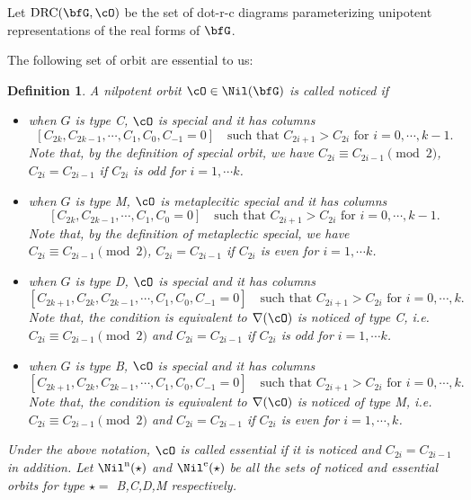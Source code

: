 \documentclass[12pt,a4paper]{amsart}
\def\DD{\nabla}
\numberwithin{equation}{section}
\newtheorem{defn}[thm]{Definition}
\theoremstyle{remark}
\def\nNil{\Nil^{\mathrm n}}
\def\eNil{\Nil^{\mathrm e}}
\def\drc{\mathrm{DRC}}
\newcommand{\noticed}{noticed }
\newcommand{\ess}{essential }
\begin{document}
Let $\drc(\bfG,\cO)$ be the set of dot-r-c diagrams parameterizing unipotent
representations of the real forms of $\bfG$.


The following set of orbit are essential to us:
\begin{defn}
  A nilpotent orbit $\cO\in \Nil(\bfG)$ is called \noticed if
  \begin{itemize}
    \item when $G$ is type C,
          $\cO$ is special and it has columns
          \[
            [C_{2k},C_{2k-1},\cdots, C_{1},C_{0}, C_{-1}=0]
            \quad \text{such that } C_{2i+1}>C_{2i} \text{ for } i=0, \cdots, k-1.
          \]
           Note that, by the
          definition of special orbit,
          we have $C_{2i}\equiv C_{2i-1} \pmod{2}$, $C_{2i} = C_{2i-1}$ if
          $C_{2i}$ is odd for $i = 1, \cdots k$.
    \item when $G$ is type M,
          $\cO$ is metaplecitic special and it has columns
          \[
            [C_{2k},C_{2k-1},\cdots, C_{1},C_{0}=0]
            \quad \text{such that } C_{2i+1}>C_{2i} \text{ for } i=0, \cdots, k-1.
          \]
          Note that, by the
          definition of metaplectic special,
          we have $C_{2i}\equiv C_{2i-1} \pmod{2}$, $C_{2i} = C_{2i-1}$ if
          $C_{2i}$ is even
          for $i = 1, \cdots k$.
    \item when $G$ is type D, $\cO$ is special and it has columns
          \[
            [C_{2k+1},C_{2k},C_{2k-1},\cdots, C_{1},C_{0}, C_{-1}=0]
            \quad \text{such that } C_{2i+1}>C_{2i} \text{ for } i=0, \cdots, k.
          \]
          Note that, the
          condition is equivalent to $\DD(\cO)$ is \noticed of type C, i.e.
           $C_{2i}\equiv C_{2i-1} \pmod{2}$ and $C_{2i} = C_{2i-1}$ if $C_{2i}$
           is odd for $i = 1, \cdots k$.
    \item when $G$ is type B, $\cO$ is special and it has columns
          \[
            [C_{2k+1},C_{2k},C_{2k-1},\cdots, C_{1},C_{0}, C_{-1}=0]
            \quad \text{such that } C_{2i+1}>C_{2i} \text{ for } i=0, \cdots, k.
          \]
          Note that, the
          condition is equivalent to $\DD(\cO)$ is \noticed of type M, i.e.
           $C_{2i}\equiv C_{2i-1} \pmod{2}$ and $C_{2i} = C_{2i-1}$ if $C_{2i}$
           is even for $i=1, \cdots, k$.
  \end{itemize}
  Under the above notation, $\cO$ is called \ess if it is \noticed and
  $C_{2i}=C_{2i-1}$ in addition.
  Let $\nNil(\star)$ and $\eNil(\star)$ be all the sets of \noticed and \ess
  orbits for type $\star=$ B,C,D,M respectively.


\end{defn}
\end{document}
